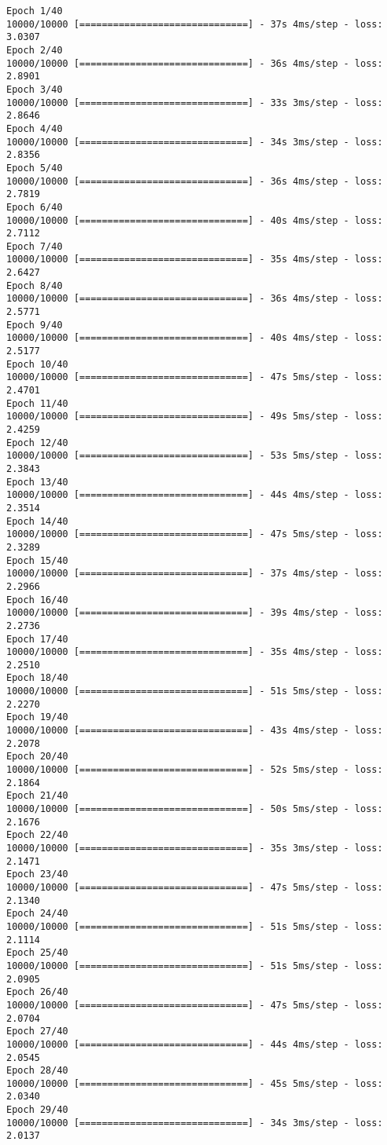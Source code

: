 \documentclass[11pt]{article}
\begin{document}
    \begin{Verbatim}[commandchars=\\\{\}]
Epoch 1/40
10000/10000 [==============================] - 37s 4ms/step - loss: 3.0307
Epoch 2/40
10000/10000 [==============================] - 36s 4ms/step - loss: 2.8901
Epoch 3/40
10000/10000 [==============================] - 33s 3ms/step - loss: 2.8646
Epoch 4/40
10000/10000 [==============================] - 34s 3ms/step - loss: 2.8356
Epoch 5/40
10000/10000 [==============================] - 36s 4ms/step - loss: 2.7819
Epoch 6/40
10000/10000 [==============================] - 40s 4ms/step - loss: 2.7112
Epoch 7/40
10000/10000 [==============================] - 35s 4ms/step - loss: 2.6427
Epoch 8/40
10000/10000 [==============================] - 36s 4ms/step - loss: 2.5771
Epoch 9/40
10000/10000 [==============================] - 40s 4ms/step - loss: 2.5177
Epoch 10/40
10000/10000 [==============================] - 47s 5ms/step - loss: 2.4701
Epoch 11/40
10000/10000 [==============================] - 49s 5ms/step - loss: 2.4259
Epoch 12/40
10000/10000 [==============================] - 53s 5ms/step - loss: 2.3843
Epoch 13/40
10000/10000 [==============================] - 44s 4ms/step - loss: 2.3514
Epoch 14/40
10000/10000 [==============================] - 47s 5ms/step - loss: 2.3289
Epoch 15/40
10000/10000 [==============================] - 37s 4ms/step - loss: 2.2966
Epoch 16/40
10000/10000 [==============================] - 39s 4ms/step - loss: 2.2736
Epoch 17/40
10000/10000 [==============================] - 35s 4ms/step - loss: 2.2510
Epoch 18/40
10000/10000 [==============================] - 51s 5ms/step - loss: 2.2270
Epoch 19/40
10000/10000 [==============================] - 43s 4ms/step - loss: 2.2078
Epoch 20/40
10000/10000 [==============================] - 52s 5ms/step - loss: 2.1864
Epoch 21/40
10000/10000 [==============================] - 50s 5ms/step - loss: 2.1676
Epoch 22/40
10000/10000 [==============================] - 35s 3ms/step - loss: 2.1471
Epoch 23/40
10000/10000 [==============================] - 47s 5ms/step - loss: 2.1340
Epoch 24/40
10000/10000 [==============================] - 51s 5ms/step - loss: 2.1114
Epoch 25/40
10000/10000 [==============================] - 51s 5ms/step - loss: 2.0905
Epoch 26/40
10000/10000 [==============================] - 47s 5ms/step - loss: 2.0704
Epoch 27/40
10000/10000 [==============================] - 44s 4ms/step - loss: 2.0545
Epoch 28/40
10000/10000 [==============================] - 45s 5ms/step - loss: 2.0340
Epoch 29/40
10000/10000 [==============================] - 34s 3ms/step - loss: 2.0137

\end{Verbatim}
\end{document}
